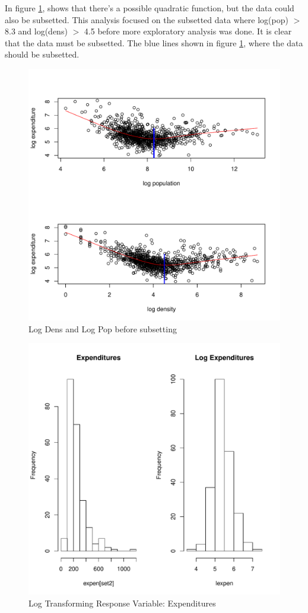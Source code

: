 \documentclass{article}\usepackage[]{graphicx}\usepackage[]{color}
\newenvironment{knitrout}{}{} %
\begin{document}
\qquad In figure \ref{subset}, shows that there's a possible quadratic function, but the data could also be subsetted. This analysis focused on the subsetted data where log(pop) $>$ 8.3 and log(dens) $>$ 4.5 before more exploratory analysis was done. It is clear that the data must be subsetted. The blue lines shown in figure \ref{subset}, where the data should be subsetted.

\begin{figure}
  \begin{center}
    \caption{Log Dens and Log Pop before subsetting}
      \label{subset}
\begin{knitrout}
\color{fgcolor}
\includegraphics[width=0.5\linewidth]{figure/Reason_for_subsetted_data-1} 

\end{knitrout}
  \end{center}
\end{figure}

\begin{figure}
\begin{center}
\caption{Log Transforming Response Variable: Expenditures}
\label{response}
\begin{knitrout}
\color{fgcolor}
\includegraphics[width=0.5\linewidth,height=0.25\textheight]{figure/Log_transform_Response-1} 

\end{knitrout}
\end{center}
\end{figure}
\end{document}
